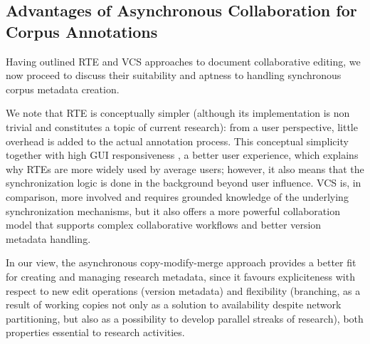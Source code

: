 \documentclass{sig-alternate}
\begin{document}



\subsection{Advantages of Asynchronous Collaboration for Corpus Annotations}
\label{subsec:hybrid}

Having outlined RTE and VCS approaches to document collaborative editing, we now proceed to discuss
their suitability and aptness to handling synchronous corpus metadata creation.

We note that RTE is conceptually simpler (although its implementation is non trivial and 
constitutes a topic of current research): from a user perspective, little overhead is added to
the actual annotation process.
This conceptual simplicity \textemdash together with high GUI responsiveness \textemdash,
a better user experience, which explains why RTEs are more widely used by average users;
however, it also means that the synchronization logic is done in the background beyond user
influence.
VCS is, in comparison, more involved and requires grounded knowledge of the underlying
synchronization mechanisms, but it also offers a more powerful collaboration model that
supports complex collaborative workflows and better version metadata handling.

In our view, the asynchronous copy-modify-merge approach provides a
better fit for creating and managing research metadata, since it favours expliciteness with
respect to new edit operations (version metadata) and flexibility (branching, as a result of
working copies not only as a solution to availability despite network
partitioning, but also as a possibility to develop parallel streaks of research),
both properties essential to research activities.
\end{document}
